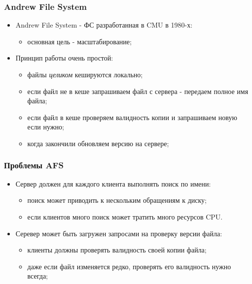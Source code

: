 \begin{frame}
\frametitle{Andrew File System}
\begin{itemize}
  \item<1-> Andrew File System - ФС разработанная в CMU в 1980-х:
    \begin{itemize}
      \item основная цель - масштабирование;
    \end{itemize}
  \item<2-> Принцип работы очень простой:
    \begin{itemize}
      \item файлы \emph{целиком} кешируются локально;
      \item если файл не в кеше запрашиваем файл с сервера - передаем полное имя файла;
      \item если файл в кеше проверяем валидность копии и запрашиваем новую если нужно;
      \item когда закончили обновляем версию на сервере;
    \end{itemize}
\end{itemize}
\end{frame}

\begin{frame}
\frametitle{Проблемы AFS}
\begin{itemize}
  \item<1-> Сервер должен для каждого клиента выполнять поиск по имени:
    \begin{itemize}
      \item поиск может приводить к нескольким обращениям к диску;
      \item если клиентов много поиск может тратить много ресурсов CPU.
    \end{itemize}
  \item<2-> Серевер может быть загружен запросами на проверку версии файла:
    \begin{itemize}
      \item клиенты должны проверять валидность своей копии файла;
      \item даже если файл изменяется редко, проверять его валидность нужно всегда;
    \end{itemize}
\end{itemize}
\end{frame}

